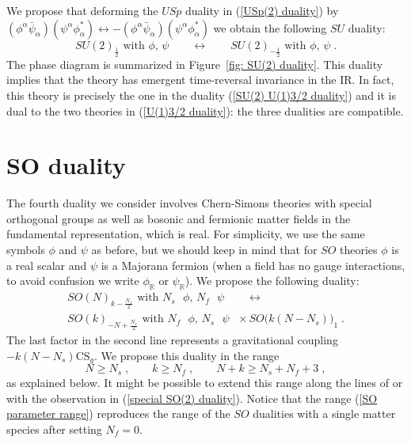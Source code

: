 \documentclass[a4paper, 12pt]{article}
\newcommand{\matht}[1]{\ensuremath{\boldsymbol{#1}}}
\numberwithin{equation}{section}
\newcommand{\be}{\begin{equation}} \newcommand{\ee}{\end{equation}}
\newcommand{\bR}{\mathbb{R}}
\begin{document}
We propose that deforming the $USp$ duality in (\ref{USp(2) duality}) by $(\phi^\alpha \bar\psi_\alpha)(\psi^\alpha \phi_\alpha^*) \leftrightarrow - (\phi^\alpha \bar\psi_\alpha)(\psi^\alpha \phi_\alpha^*)$ we obtain the following $SU$ duality:
\be
SU(2)_\frac12 \text{ with $\phi$, $\psi$} \qquad\longleftrightarrow\qquad SU(2)_{-\frac12} \text{ with $\phi$, $\psi$} \;.
\ee
The phase diagram is summarized in Figure~\ref{fig: SU(2) duality}. This duality implies that the theory has emergent time-reversal invariance in the IR. In fact, this theory is precisely the one in the duality (\ref{SU(2) U(1)3/2 duality}) and it is dual to the two theories in (\ref{U(1)3/2 duality}): the three dualities are compatible.

















\section{\matht{SO} duality}
\label{sec: SO duality}

The fourth duality we consider involves Chern-Simons theories with special orthogonal groups as well as bosonic and fermionic matter fields in the fundamental representation, which is real. For simplicity, we use the same symbols $\phi$ and $\psi$ as before, but we should keep in mind that for $SO$ theories $\phi$ is a real scalar and $\psi$ is a Majorana fermion (when a field has no gauge interactions, to avoid confusion we write $\phi_\bR$ or $\psi_\bR$). We propose the following duality:
\begin{multline}
\label{SO duality grav}
SO(N)_{k - \frac{N_f}2} \text{ with $N_s$ $\phi$, $N_f$ $\psi$} \qquad\longleftrightarrow \\
SO(k)_{-N + \frac{N_s}2} \text{ with $N_f$ $\phi$, $N_s$ $\psi$ } \times SO\big( k(N-N_s) \big)_1 \;.
\end{multline}
The last factor in the second line represents a gravitational coupling $-k(N-N_s) \text{CS}_g$. We propose this duality in the range
\be
\label{SO parameter range}
N \geq N_s \;,\qquad k \geq N_f \;,\qquad N+k \geq N_s + N_f + 3 \;,
\ee
as explained below. It might be possible to extend this range along the lines of \cite{Komargodski:2017keh} or with the observation in (\ref{special SO(2) duality}). Notice that the range (\ref{SO parameter range}) reproduces the range of the $SO$ dualities with a single matter species \cite{Aharony:2016jvv} after setting $N_f =0$.
\end{document}
